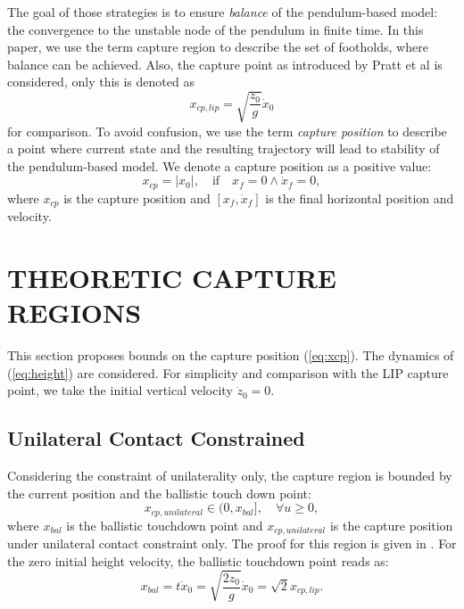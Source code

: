 \documentclass[letterpaper, 10 pt, conference]{ieeeconf}  %
\begin{document}
The goal of those strategies is to ensure \textit{balance} of the pendulum-based model: the convergence to the unstable node of the pendulum in finite time. In this paper, we use the term capture region \cite{pratt2006capture} to describe the set of footholds, where balance can be achieved. Also, the capture point as introduced by Pratt et al is considered, only this is denoted as
\begin{equation}
	x_{cp,lip} = \sqrt{\frac{z_0}{g}}\dot{x}_0
\end{equation}
for comparison. To avoid confusion, we use the term \textit{capture position} to describe a point where current state and the resulting trajectory will lead to stability of the pendulum-based model. We denote a capture position as a positive value:
\begin{equation}
	x_{cp}= |x_0|,\quad \text{if} \quad x_f=0 \wedge \dot{x}_f=0,
	\label{eq:xcp}
\end{equation}
where $x_{cp}$ is the capture position and $[x_f, \dot{x}_f]$ is the final horizontal position and velocity.

\section{THEORETIC CAPTURE REGIONS}\label{sec:regions}
This section proposes bounds on the capture position (\ref{eq:xcp}). The dynamics of (\ref{eq:height}) are considered. For simplicity and comparison with the LIP capture point, we take the initial vertical velocity $\dot{z}_0=0$.
\subsection{Unilateral Contact Constrained}
 Considering the constraint of unilaterality only, the capture region is bounded by the current position and the ballistic touch down point:
\begin{equation}
	x_{cp,unilateral} \in (0, x_{bal}], \quad \forall u \geq 0, 
	\label{eq:xcpuni}
\end{equation}
where $x_{bal}$ is the ballistic touchdown point and $x_{cp,unilateral}$ is the capture position under unilateral contact constraint only. The proof for this region is given in \cite{koolen2016balance}. For the zero initial height velocity, the ballistic touchdown point reads as:
\begin{equation}
 x_{bal}=t \dot{x}_0=\sqrt{\frac{2z_0}{g}}\dot{x}_0=\sqrt{2}x_{cp,lip}.
 	\label{eq:xbal}
\end{equation}
\end{document}
